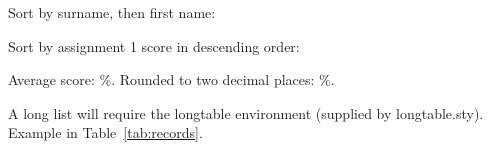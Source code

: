 \documentclass[captions=tableheading]{scrartcl}
\begin{document}
Sort by surname, then first name:


Sort by assignment 1 score in descending order:


Average score: 
%
\averagescore\%.
Rounded to two decimal places: %
\averagescore\%.

A long list will require the longtable environment (supplied by
longtable.sty). Example in Table~\ref{tab:records}.

\end{document}
